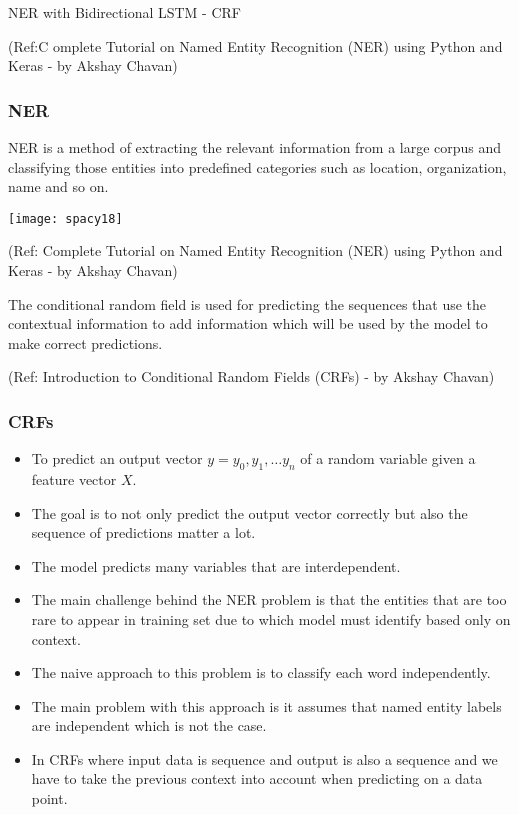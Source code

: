 \begin{frame}[fragile]\frametitle{}

\begin{center}
{\Large NER with Bidirectional LSTM - CRF}

{\tiny (Ref:C omplete Tutorial on Named Entity Recognition (NER) using Python and Keras - by Akshay Chavan)}
\end{center}


\end{frame}


\begin{frame}[fragile]\frametitle{NER}
NER is a method of extracting the relevant information from a large corpus and classifying those entities into predefined categories such as location, organization, name and so on. 
	
\begin{center}
\texttt{[image: spacy18]}

	{\tiny (Ref: Complete Tutorial on Named Entity Recognition (NER) using Python and Keras - by Akshay Chavan)}

\end{center}

The conditional random field is used for predicting the sequences that use the contextual information to add information which will be used by the model to make correct predictions.

	{\tiny (Ref: Introduction to Conditional Random Fields (CRFs) - by Akshay Chavan)}

\end{frame}

\begin{frame}[fragile]\frametitle{CRFs}
  \begin{itemize}
  \item To predict an output vector $y = {y_0, y_1, \ldots y_n}$ of a random variable given a feature vector $X$.
	\item The goal is to not only predict the output vector correctly but also the sequence of predictions matter a lot.
	\item The model predicts many variables that are interdependent.
	\item The main challenge behind the NER problem is that the entities that are too rare to appear in training set due to which model must identify based only on context. 
	\item The naive approach to this problem is to classify each word independently. 
	\item The main problem with this approach is it assumes that named entity labels are independent which is not the case.
	\item In CRFs where input data is sequence and output is also a sequence and we have to take the previous context into account when predicting on a data point.
  \end{itemize}
	

\end{frame}

